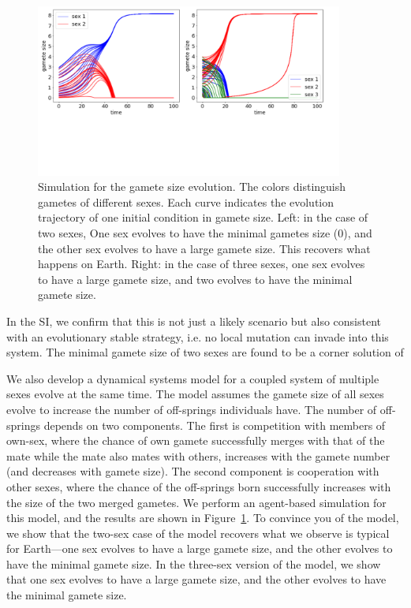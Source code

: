 \documentclass{report}
\begin{document}
\begin{figure}[htb!]
    \centering
    \includegraphics[width = 0.9\textwidth]{vickysFigs/2panels}
    \caption{Simulation for the gamete size evolution. The colors distinguish gametes of different sexes. Each curve indicates the evolution trajectory of one initial condition in gamete size. Left: in the case of two sexes,  One sex evolves to have the minimal gametes size ($0$), and the other sex evolves to have a large gamete size. This recovers what happens on Earth. Right: in the case of three sexes, one sex evolves to have a large gamete size, and two evolves to have the minimal gamete size.}
    \label{fig:gameteSize2Panel}
\end{figure}

In the SI, we confirm that this is not just a likely scenario but also consistent with an evolutionary stable strategy, i.e. no local mutation can invade into this system. The minimal gamete size of two sexes are found to be a corner solution of 

We also develop a dynamical systems model for a coupled system of multiple sexes evolve at the same time. The model assumes the gamete size of all sexes evolve to increase the number of off-springs individuals have. The number of off-springs depends on two components. The first is competition with members of own-sex, where the chance of own gamete successfully merges with that of the mate while the mate also mates with others, increases with the gamete number (and decreases with gamete size). The second component is cooperation with other sexes, where the chance of the off-springs born successfully increases with the size of the two merged gametes. We perform an agent-based simulation for this model, and the results are shown in Figure~\ref{fig:gameteSize2Panel}. To convince you of the model, we show that the two-sex case of the model recovers what we observe is typical for Earth---one sex evolves to have a large gamete size, and the other evolves to have the minimal gamete size. In the three-sex version of the model, we show that one sex evolves to have a large gamete size, and the other evolves to have the minimal gamete size. 
\end{document}
